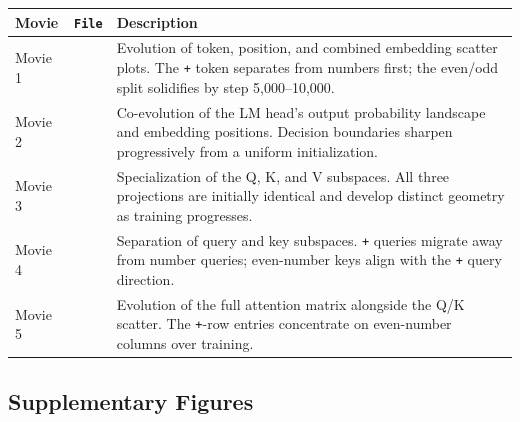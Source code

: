 \documentclass[
  11pt,
  a4paper,
]{article}
\begin{document}
\begin{xltabular}{\linewidth}{@{}l>{\raggedright\arraybackslash}p{3.5cm}>{\raggedright\arraybackslash}X@{}}
\toprule
Movie & \texttt{File} & Description \\
\midrule
Movie 1 & \parbox[t]{3.5cm}{\raggedright\ttfamily\href{https://github.com/Raneem-mahajne/creating_transformer/blob/main/plus_last_even/plots/learning_dynamics/01_embeddings_scatterplots.gif}{}} & Evolution of token, position, and combined embedding scatter plots. The \texttt{+} token separates from numbers first; the even/odd split solidifies by step 5,000--10,000. \\
Movie 2 & \parbox[t]{3.5cm}{\raggedright\ttfamily\href{https://github.com/Raneem-mahajne/creating_transformer/blob/main/plus_last_even/plots/learning_dynamics/05_output_heatmaps_with_embeddings.gif}{}} & Co-evolution of the LM head's output probability landscape and embedding positions. Decision boundaries sharpen progressively from a uniform initialization. \\
Movie 3 & \parbox[t]{3.5cm}{\raggedright\ttfamily\href{https://github.com/Raneem-mahajne/creating_transformer/blob/main/plus_last_even/plots/learning_dynamics/02_embedding_qkv_comprehensive.gif}{}} & Specialization of the Q, K, and V subspaces. All three projections are initially identical and develop distinct geometry as training progresses. \\
Movie 4 & \parbox[t]{3.5cm}{\raggedright\ttfamily\href{https://github.com/Raneem-mahajne/creating_transformer/blob/main/plus_last_even/plots/learning_dynamics/03_qk_embedding_space.gif}{}} & Separation of query and key subspaces. \texttt{+} queries migrate away from number queries; even-number keys align with the \texttt{+} query direction. \\
Movie 5 & \parbox[t]{3.5cm}{\raggedright\ttfamily\href{https://github.com/Raneem-mahajne/creating_transformer/blob/main/plus_last_even/plots/learning_dynamics/04_qk_space_plus_attention.gif}{}} & Evolution of the full attention matrix alongside the Q/K scatter. The \texttt{+}-row entries concentrate on even-number columns over training. \\
\bottomrule
\end{xltabular}

\subsection{Supplementary Figures}\label{supplementary-figures}
\end{document}

